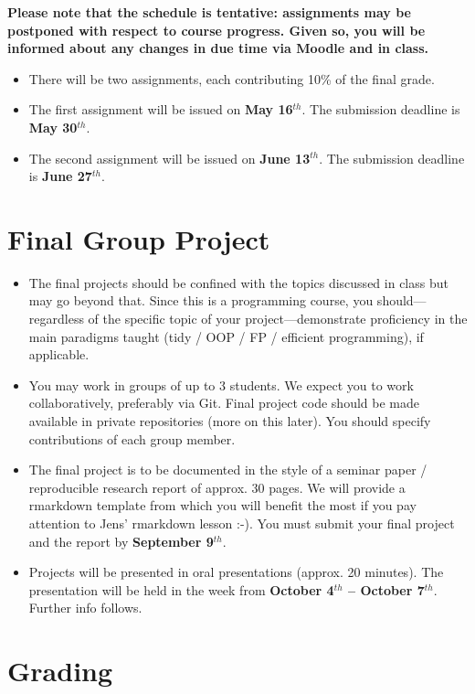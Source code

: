 \documentclass[]{article}
\begin{document}
\textbf{Please note that the schedule is tentative: assignments may be
postponed with respect to course progress. Given so, you will be
informed about any changes in due time via Moodle and in class.}

\begin{itemize}
\item
  There will be two assignments, each contributing 10\% of the final
  grade.
\item
  The first assignment will be issued on \textbf{May 16\(^{th}\)}. The
  submission deadline is \textbf{May 30\(^{th}\)}.
\item
  The second assignment will be issued on \textbf{June 13\(^{th}\)}. The
  submission deadline is \textbf{June 27\(^{th}\)}.
\end{itemize}

\hypertarget{final-group-project}{%
\section{Final Group Project}\label{final-group-project}}

\begin{itemize}
\item
  The final projects should be confined with the topics discussed in
  class but may go beyond that. Since this is a programming course, you
  should---regardless of the specific topic of your
  project---demonstrate proficiency in the main paradigms taught (tidy /
  OOP / FP / efficient programming), if applicable.
\item
  You may work in groups of up to 3 students. We expect you to work
  collaboratively, preferably via Git. Final project code should be made
  available in private repositories (more on this later). You should
  specify contributions of each group member.
\item
  The final project is to be documented in the style of a seminar paper
  / reproducible research report of approx. 30 pages. We will provide a
  rmarkdown template from which you will benefit the most if you pay
  attention to Jens' rmarkdown lesson :-). You must submit your final
  project and the report by \textbf{September 9\(^{th}\)}.
\item
  Projects will be presented in oral presentations (approx. 20 minutes).
  The presentation will be held in the week from \textbf{October
  4\(^{th}\) -- October 7\(^{th}\)}. Further info follows.
\end{itemize}

\hypertarget{grading}{%
\section{Grading}\label{grading}}
\end{document}
